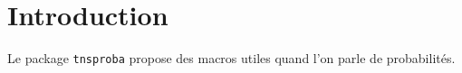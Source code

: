 \documentclass[12pt,a4paper]{article}
\begin{document}
\section{Introduction}

Le package \verb+tnsproba+ propose des macros utiles quand l'on parle de probabilités.
\end{document}

